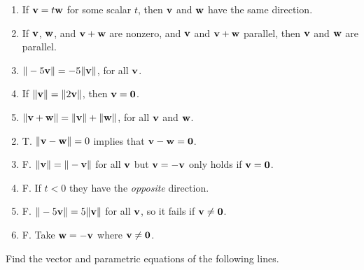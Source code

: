 \begin{multicols}{2}
\begin{ex}
\begin{enumerate}[label={\alph*.}]
\item If $\textbf{v} = t\textbf{w}$ for some scalar $t$, then $\textbf{v}$ and $\textbf{w}$ have the same direction.

\item If $\textbf{v}$, $\textbf{w}$, and $\textbf{v} + \textbf{w}$ are nonzero, and $\textbf{v}$ and $\textbf{v} + \textbf{w}$ parallel, then $\textbf{v}$ and $\textbf{w}$ are parallel.

\item $\|-5\textbf{v}\| = -5\|\textbf{v}\|$, for all $\textbf{v}$.

\item If $\|\textbf{v}\| = \| 2\textbf{v}\|$, then $\textbf{v} = \textbf{0}$.

\item $\|\textbf{v} + \textbf{w}\| = \|\textbf{v}\| + \|\textbf{w}\|$, for all $\textbf{v}$ and $\textbf{w}$.

\end{enumerate}
\begin{sol}
\begin{enumerate}[label={\alph*.}]
\setcounter{enumi}{1}
\item  T. $\|\textbf{v} - \textbf{w}\| = 0$ implies that $\textbf{v} - \textbf{w} = \textbf{0}$.

\setcounter{enumi}{3}
\item  F. $\|\textbf{v}\| = \| - \textbf{v}\|$ for all $\textbf{v}$ but $\textbf{v} = -\textbf{v}$ only holds if $\textbf{v} = \textbf{0}$.

\setcounter{enumi}{5}
\item  F. If $t < 0$ they have the \textit{opposite} direction.

\setcounter{enumi}{7}
\item  F. $\| -5\textbf{v}\| = 5\|\textbf{v}\|$ for all $\textbf{v}$, so it fails if $\textbf{v} \neq \textbf{0}$.

\setcounter{enumi}{9}
\item  F. Take $\textbf{w} = -\textbf{v}$ where $\textbf{v} \neq \textbf{0}$.

\end{enumerate}
\end{sol}
\end{ex}

\begin{ex}
Find the vector and parametric equations of the following lines.



\end{ex}
\end{multicols}
